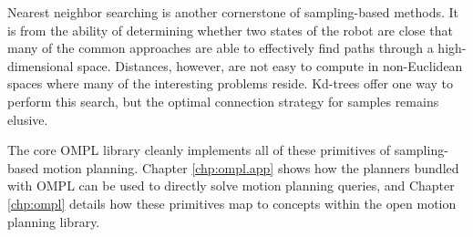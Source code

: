 Nearest neighbor searching is another cornerstone of sampling-based methods.
It is from the ability of determining whether two states of the robot are close
that many of the common approaches are able to effectively find paths through a
high-dimensional space.  Distances, however, are not easy to compute in
non-Euclidean spaces where many of the interesting problems reside.  Kd-trees
offer one way to perform this search, but the optimal connection strategy for
samples remains elusive.

The core OMPL library cleanly implements all of these primitives of
sampling-based motion planning.  Chapter \ref{chp:ompl.app} shows how the
planners bundled with OMPL can be used to directly solve motion planning
queries, and Chapter \ref{chp:ompl} details how these primitives map to concepts
within the open motion planning library.

